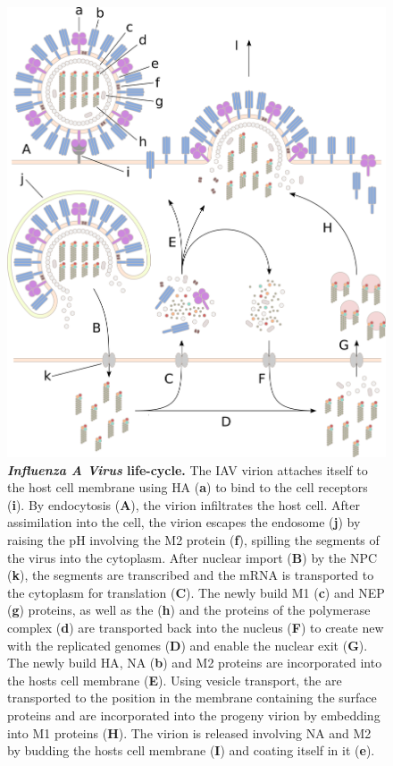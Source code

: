 \begin{figure}[!hbt]
    \centering
    \includegraphics[width=\textwidth]{Graphics/cycle.pdf}
    \caption[\textit{Influenza A Virus} life-cycle]{\textbf{\textit{Influenza A Virus} life-cycle.} The \gls{IAV} virion attaches itself to the host cell membrane using \gls{HA} (\textsf{\textbf{a}}) to bind to the cell receptors (\textsf{\textbf{i}}). By endocytosis (\textsf{\textbf{A}}), the virion infiltrates the host cell. After assimilation into the cell, the virion escapes the endosome (\textsf{\textbf{j}}) by raising the pH involving the \acrshort{M2} protein (\textsf{\textbf{f}}), spilling the segments of the virus into the cytoplasm. After nuclear import (\textsf{\textbf{B}}) by the \gls{NPC} (\textsf{\textbf{k}}), the segments are transcribed and the \acrshort{mRNA} is transported to the cytoplasm for translation (\textsf{\textbf{C}}). The newly build \acrshort{M1} (\textsf{\textbf{c}}) and \acrshort{NEP} (\textsf{\textbf{g}}) proteins, as well as the  (\textsf{\textbf{h}}) and the proteins of the polymerase complex (\textsf{\textbf{d}}) are transported back into the nucleus (\textsf{\textbf{F}}) to create new  with the replicated genomes (\textsf{\textbf{D}}) and enable the nuclear exit (\textsf{\textbf{G}}). The newly build \acrshort{HA}, \acrshort{NA} (\textsf{\textbf{b}}) and \acrshort{M2} proteins are incorporated into the hosts cell membrane (\textsf{\textbf{E}}). Using vesicle transport, the  are transported to the position in the membrane containing the surface proteins and are incorporated into the progeny virion by embedding into \acrshort{M1} proteins (\textsf{\textbf{H}}). The virion is released involving \acrshort{NA} and \acrshort{M2} by budding the hosts cell membrane (\textsf{\textbf{I}}) and coating itself in it (\textsf{\textbf{e}}).}

\end{figure}
